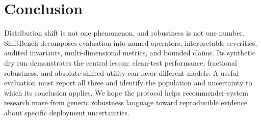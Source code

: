 \section{Conclusion}
\label{sec:conclusion}

Distribution shift is not one phenomenon, and robustness is not one number.
ShiftBench decomposes evaluation into named operators, interpretable severities,
audited invariants, multi-dimensional metrics, and bounded claims.  Its synthetic
dry run demonstrates the central lesson: clean-test performance, fractional
robustness, and absolute shifted utility can favor different models.  A useful
evaluation must report all three and identify the population and uncertainty to
which its conclusion applies.  We hope the protocol helps recommender-system
research move from generic robustness language toward reproducible evidence
about specific deployment uncertainties.


